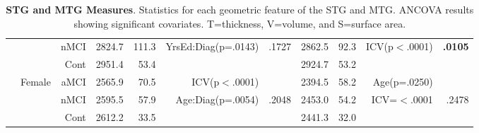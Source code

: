 \documentclass[12pt]{article}\usepackage[]{graphicx}\usepackage[]{color}
\newcommand\T{\rule{0pt}{2.6ex}}
\begin{document}
\begin{sidewaystable}
\begin{tabular}{l|rr|rrrr|rrrr}
							&						& nMCI & 2824.7 & 111.3 & YrsEd:Diag(p=.0143) & .1727  & 2862.5 & 92.3 & ICV(p$<$.0001) & \textbf{.0105}\\
							&						& Cont & 2951.4 & 53.4 & &  & 2924.7 & 53.2 & &  \\\cline{2-11}
							&	\multirow{3}{*}{Female}	& aMCI\T & 2565.9 & 70.5 & ICV(p$<$.0001) &  & 2394.5 & 58.2 & Age(p=.0250) & \\
							&						& nMCI & 2595.5 & 57.9 & Age:Diag(p=.0054) & .2048  & 2453.0 & 54.2 & ICV=$<$.0001 & .2478\\
							&						& Cont & 2612.2 & 33.5 & & & 2441.3 & 32.0 & &\\
	
	\end{tabular}
	\caption{\textbf{STG and MTG Measures}.  Statistics for each geometric feature of the STG and MTG.  ANCOVA results showing significant covariates. T=thickness, V=volume, and S=surface area.}
	\label{Wave1.STG.MTG.ANCOVA}
\end{sidewaystable}
\end{document}
